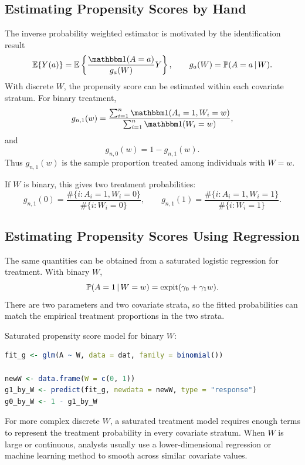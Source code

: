 \label{lec:4-4}

\subsection{Estimating Propensity Scores by Hand}

The inverse probability weighted estimator is motivated by the identification result
\[
\E\{\Ya{a}\}
=
\E\left\{
\frac{\ind(A=a)}{g_a(W)}Y
\right\},
\qquad
g_a(W)=\Prob(A=a\given W).
\]
With discrete $W$, the propensity score can be estimated within each covariate
stratum. For binary treatment,
\[
g_{n,1}(w)
=
\frac{\sum_{i=1}^n \ind(A_i=1,W_i=w)}
       {\sum_{i=1}^n \ind(W_i=w)},
\]
and
\[
g_{n,0}(w)=1-g_{n,1}(w).
\]
Thus $g_{n,1}(w)$ is the sample proportion treated among individuals with $W=w$.

If $W$ is binary, this gives two treatment probabilities:
\[
g_{n,1}(0)=\frac{\#\{i:A_i=1,W_i=0\}}{\#\{i:W_i=0\}},
\qquad
g_{n,1}(1)=\frac{\#\{i:A_i=1,W_i=1\}}{\#\{i:W_i=1\}}.
\]

\subsection{Estimating Propensity Scores Using Regression}

The same quantities can be obtained from a saturated logistic regression for
treatment. With binary $W$,
\[
\mathbb{P}(A=1\,\vert\, W=w)=\operatorname{expit}(\gamma_0+\gamma_1w).
\]
There are two parameters and two covariate strata, so the fitted probabilities can
match the empirical treatment proportions in the two strata.

\begin{implementationbox}
Saturated propensity score model for binary $W$:
\begin{lstlisting}[language=R]
fit_g <- glm(A ~ W, data = dat, family = binomial())

newW <- data.frame(W = c(0, 1))
g1_by_W <- predict(fit_g, newdata = newW, type = "response")
g0_by_W <- 1 - g1_by_W
\end{lstlisting}
\end{implementationbox}

For more complex discrete $W$, a saturated treatment model requires enough terms to
represent the treatment probability in every covariate stratum. When $W$ is large or
continuous, analysts usually use a lower-dimensional regression or machine learning
method to smooth across similar covariate values.

